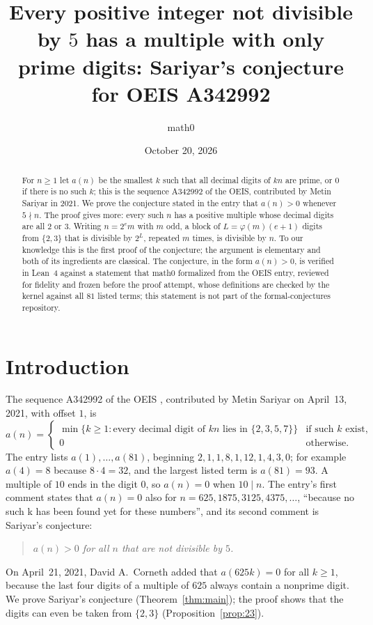 \documentclass[11pt]{amsart}
\title[Sariyar's conjecture for OEIS A342992]{Every positive integer not divisible by $5$ has a multiple with only prime digits: Sariyar's conjecture for OEIS A342992}
\author{math0}
\date{October 20, 2026}
\theoremstyle{plain}
\theoremstyle{definition}
\begin{document}
\begin{abstract}
For $n\ge1$ let $a(n)$ be the smallest $k$ such that all decimal digits of $kn$ are prime, or $0$ if there is no such $k$; this is the sequence A342992 of the OEIS, contributed by Metin Sariyar in 2021.
We prove the conjecture stated in the entry that $a(n)>0$ whenever $5\nmid n$. The proof gives more: every such $n$ has a positive multiple whose decimal digits are all $2$ or $3$. Writing $n=2^em$ with $m$ odd, a block of $L=\varphi(m)(e+1)$ digits from $\{2,3\}$ that is divisible by $2^L$, repeated $m$ times, is divisible by $n$.
To our knowledge this is the first proof of the conjecture; the argument is elementary and both of its ingredients are classical.
The conjecture, in the form $a(n)>0$, is verified in Lean~4 against a statement that math0 formalized from the OEIS entry, reviewed for fidelity and frozen before the proof attempt, whose definitions are checked by the kernel against all $81$ listed terms; this statement is not part of the formal-conjectures repository.
\end{abstract}
\maketitle

\section{Introduction}

The sequence A342992 of the OEIS \cite{A342992}, contributed by Metin Sariyar on April~13, 2021, with offset $1$, is
\[
  a(n)=\begin{cases}\min\{k\ge1: \text{every decimal digit of } kn \text{ lies in } \{2,3,5,7\}\} & \text{if such } k \text{ exist},\\ 0 & \text{otherwise}.\end{cases}
\]
The entry lists $a(1),\dots,a(81)$, beginning $2,1,1,8,1,12,1,4,3,0$; for example $a(4)=8$ because $8\cdot4=32$, and the largest listed term is $a(81)=93$. A multiple of $10$ ends in the digit $0$, so $a(n)=0$ when $10\mid n$. The entry's first comment states that $a(n)=0$ also for $n=625,1875,3125,4375,\dots$, ``because no such k has been found yet for these numbers'', and its second comment is Sariyar's conjecture:
\begin{quote}
\emph{$a(n)>0$ for all $n$ that are not divisible by $5$.}
\end{quote}
On April~21, 2021, David A.~Corneth added that $a(625k)=0$ for all $k\ge1$, because the last four digits of a multiple of $625$ always contain a nonprime digit. We prove Sariyar's conjecture (Theorem~\ref{thm:main}); the proof shows that the digits can even be taken from $\{2,3\}$ (Proposition~\ref{prop:23}).
\end{document}
